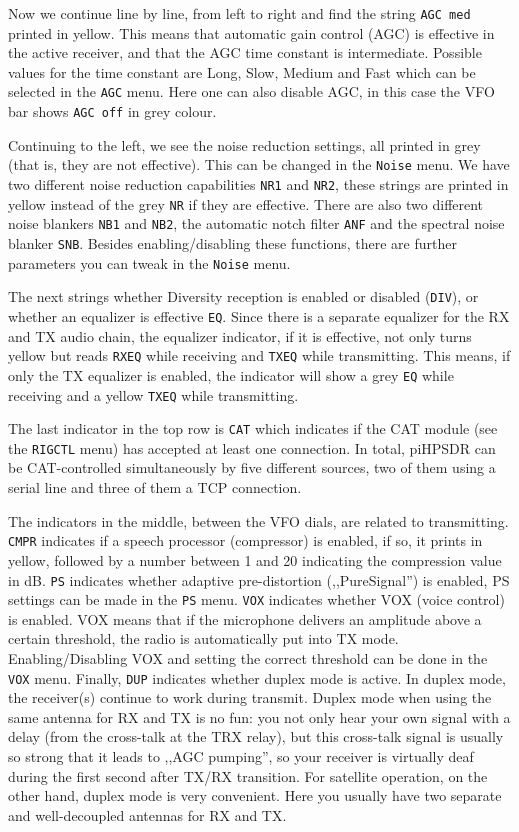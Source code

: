 \documentclass[12pt]{book}
\begin{document}
Now we continue line by line, from left to right and find
the string \texttt{AGC med} printed in yellow. This means
that automatic gain control (AGC)  is effective  in the
active receiver, and that the AGC time constant is
intermediate. Possible values for the time constant 
are Long, Slow, Medium and Fast which can be selected
in the \texttt{AGC} menu. Here one can  also disable AGC,
in this case the VFO bar shows \texttt{AGC off} in grey
colour.

Continuing to the left, we see the noise reduction settings,
all printed in grey (that is, they are not effective). This
can be changed in the \texttt{Noise} menu. We have two different
noise reduction capabilities \texttt{NR1} and \texttt{NR2}, these
strings are printed in yellow instead of the grey \texttt{NR} if
they are effective. There are also two different noise blankers
\texttt{NB1} and \texttt{NB2}, the automatic notch  filter
\texttt{ANF} and the spectral  noise blanker \texttt{SNB}.
Besides enabling/disabling these functions, there are  further parameters
you can tweak in the \texttt{Noise} menu.

The next strings whether Diversity reception is enabled or disabled
(\texttt{DIV}), or whether an equalizer is effective \texttt{EQ}.
Since there is a separate equalizer for the RX and TX audio chain,
the equalizer indicator, if it is effective, not only turns yellow
but reads \texttt{RXEQ} while receiving and \texttt{TXEQ} while
transmitting. This means, if only the TX equalizer is enabled,
the indicator will show a  grey \texttt{EQ} while receiving
and a yellow \texttt{TXEQ}  while  transmitting.

The last indicator in the top row  is \texttt{CAT} which indicates
if the CAT module  (see the \texttt{RIGCTL}  menu) has accepted at least
one connection. In total, piHPSDR can be CAT-controlled simultaneously
by five different sources, two of them using a serial line and
three of them a TCP connection. 

The indicators in the middle, between the VFO dials, are related to
transmitting. \texttt{CMPR} indicates if a speech processor
(compressor) is enabled, if so, it prints in yellow, followed
by a number between 1 and 20 indicating the compression value in dB.
\texttt{PS} indicates whether adaptive pre-distortion (,,PureSignal'')
is enabled, PS settings can be made in the \texttt{PS} menu.
 \texttt{VOX} indicates whether VOX (voice control) is enabled. VOX means
 that if  the microphone delivers an amplitude above a certain threshold,
 the radio is automatically put into TX mode. Enabling/Disabling VOX
 and setting the correct threshold can be done in the \texttt{VOX} menu.
 Finally, \texttt{DUP} indicates whether duplex mode is active.
 In duplex mode, the receiver(s) continue to work during transmit. Duplex
 mode when using the same antenna for RX and TX is  no fun: you not only hear
 your own signal with a delay (from the cross-talk at the TRX relay), but
 this cross-talk signal is  usually so strong that it leads to ,,AGC pumping'', so
 your receiver is virtually deaf during the first second after TX/RX
 transition. For satellite operation, on the other hand, duplex  mode
 is very convenient. Here you usually have two separate and well-decoupled
 antennas for RX and TX.
 
\end{document}
